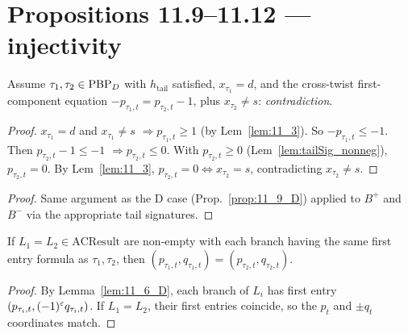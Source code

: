 \section{Propositions 11.9--11.12 — injectivity}

\begin{lemma}
  \label{prop:11_9_D}
  \leanok
  Assume $\tau_1, \tau_2 \in \mathrm{PBP}_D$ with $h_{\mathrm{tail}}$ satisfied, $x_{\tau_1} = d$, and the cross-twist first-component equation
  $-p_{\tau_1, t} = p_{\tau_2, t} - 1$, plus $x_{\tau_2} \neq s$: \emph{contradiction}.
\end{lemma}

\begin{proof}
  \leanok
  $x_{\tau_1} = d$ and $x_{\tau_1} \neq s$ $\Rightarrow p_{\tau_1, t} \geq 1$ (by Lem~\ref{lem:11_3}).
  So $-p_{\tau_1, t} \leq -1$.
  Then $p_{\tau_2, t} - 1 \leq -1$ $\Rightarrow p_{\tau_2, t} \leq 0$. With $p_{\tau_2, t} \geq 0$ (Lem~\ref{lem:tailSig_nonneg}), $p_{\tau_2, t} = 0$.
  By Lem~\ref{lem:11_3}, $p_{\tau_2, t} = 0 \iff x_{\tau_2} = s$, contradicting $x_{\tau_2} \neq s$.
\end{proof}

\begin{lemma}
  \label{prop:11_9_B}
  \leanok
\end{lemma}
\begin{proof}
  \leanok
  Same argument as the D case (Prop.~\ref{prop:11_9_D}) applied to $B^+$ and $B^-$ via the appropriate tail signatures.
\end{proof}


\begin{lemma}
  \label{prop:11_10_D}
  \leanok
  If $L_1 = L_2 \in \mathrm{ACResult}$ are non-empty with each branch having the
  same first entry formula as $\tau_1, \tau_2$, then $(p_{\tau_1, t}, q_{\tau_1, t}) = (p_{\tau_2, t}, q_{\tau_2, t})$.
\end{lemma}
\begin{proof}
  \leanok
  By Lemma~\ref{lem:11_6_D}, each branch of $L_i$ has first entry $(p_{\tau_i, t}, (-1)^{\varepsilon} q_{\tau_i, t})$. If $L_1 = L_2$, their first entries coincide, so the $p_t$ and $\pm q_t$ coordinates match.
\end{proof}


